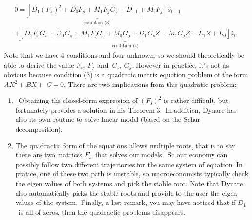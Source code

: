 \documentclass[a4paper,12pt]{article}%
\begin{document}
\begin{multline*}
0=\underset{\text{condition (3)}}{\underbrace{\left[  D_{1}\left(
F_{s}\right)  ^{2}+D_{0}F_{s}+M_{1}F_{j}G_{s}+D_{-1}+M_{0}F_{j}\right]  }}%
\hat{s}_{t-1}\\
+\underset{\text{condition (4)}}{\underbrace{\left[  D_{1}F_{s}G_{s}%
+D_{0}G_{s}+M_{1}F_{j}G_{s}+M_{0}G_{j}+D_{1}G_{s}Z+M_{1}G_{j}Z+L_{1}%
Z+L_{0}\right]  }}\hat{z}_{t},
\end{multline*}
Note that we have 4 conditions and four unknown, so we should theoretically be
able to derive the value $F_{s}$, $F_{j}$\ and\ $G_{s}$, $G_{j}$. However in
practice, it's not as obvious because condition (3) is a quadratic matrix
equation problem of the form $AX^{2}+BX+\ C=0$. There are two implications
from this quadratic problem:

\begin{enumerate}
\item \ Obtaining the closed-form expression of $\left(  F_{s}\right)  ^{2}$
is rather difficult, but fortunately \cite{uhlig1995toolkit} provides a
solution in his Theorem 3.\ In addition, Dynare has also its own routine to
solve linear model (based on the Schur decomposition).\ 

\item The quadractic form of the equations allows multiple roots, that is to
say there are two matrices $F_{s}$\ that solves our models.\ So our economy
can possibly follow two different trajectories for the same system of
equation. In pratice, one of these two path is unstable, so macroeconomists
typically check the eigen values of both systems and pick the stable root.
Note that Dynare also automatically picks the stable roots and provide to the
user the eigen values of the system.\ Finally, a last remark, you may have
noticed that if $D_{1}$\ is all of zeros, then the quadractic problems disappears.
\end{enumerate}
\end{document}
